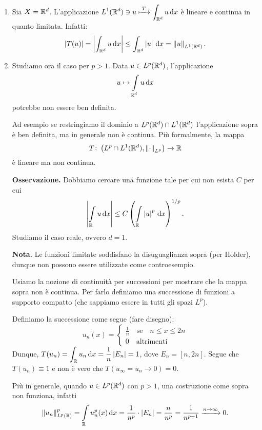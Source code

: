 \documentclass[a4paper, 12pt]{report}
\begin{document}
\begin{enumerate}
\item Sia $X = \mathbb R^d$. L'applicazione $\displaystyle L^1(\mathbb R^d) \ni u \xmapsto{\; T \;} \int_{\mathbb R^d} u \,\mathrm{d} x$ è lineare e continua in quanto limitata. Infatti:
%
$$
\left| T(u) \right| = \left| \int_{\mathbb R^d} u \,\mathrm{d} x  \right| \leq \int_{\mathbb R^d} \left| u \right| \,\mathrm{d} x = \left\lVert u \right\rVert_{L^1(\mathbb R^d)}.
$$
%

\item Studiamo ora il caso per $p > 1$. Data $u \in L^p(\mathbb R^d)$, l'applicazione
%
$$
u \mapsto \int\limits_{\mathclap{\R^d}} u \dd x 
$$
%
potrebbe non essere ben definita.

Ad esempio se restringiamo il dominio a $L^p(\mathbb R^d) \cap L^1(\mathbb R^d)$ l'applicazione sopra è ben definita, ma in generale non è continua.
Più formalmente, la mappa
%
$$
T \colon \left( L^p \cap L^1(\mathbb R^d), \left\lVert \cdot \right\rVert_{L^p} \right) \to \mathbb R
$$
%
è lineare ma non continua.

\textbf{Osservazione.} Dobbiamo cercare una funzione tale per cui non esista $C$ per cui
%
$$
\left| \int\limits_{\mathclap{\R}} u \dd x  \right| \leq C \left( \int\limits_{\mathclap{\R}} \left| u \right|^p \dd x  \right)^{1/p}.
$$
%
Studiamo il caso reale, ovvero $d = 1$.

\textbf{Nota.} Le funzioni limitate soddisfano la disuguaglianza sopra (per Holder), dunque non possono essere utilizzate come controesempio. 

Usiamo la nozione di continuità per successioni per mostrare che la mappa sopra non è continua. Per farlo definiamo una successione di funzioni a supporto compatto (che sappiamo essere in tutti gli spazi $L^p$).

Definiamo la successione come segue (fare disegno):
%
$$
u_n (x) =
\begin{cases}
\frac{1}{n} \quad \text{se} \quad n \leq x \leq 2n \\
0 \quad \text{altrimenti} 
\end{cases} 
$$
%
Dunque, $\displaystyle T(u_n) = \int_{\mathbb R} u_n \,\mathrm{d} x = \frac{1}{n} \left| E_n \right| = 1$, dove $E_n = [n,2n]$.
Segue che $T(u_n) \equiv 1$ e non è vero che $T(u_\infty = u_n \to 0) = 0$.

Più in generale, quando $u \in L^p(\mathbb R^d)$ con $p > 1$, una costruzione come sopra non funziona, infatti
%
$$
\norm{u_n}_{L^p(\R)}^p = \int\limits_{\mathclap{\R}} u_n^p(x) \dd x = \frac{1}{n^p} \cdot \left| E_n \right| = \frac{n}{n^p} = \frac{1}{n^{p-1}} \xrightarrow{n \to \infty} 0.
$$
%

\end{enumerate}
\end{document}
